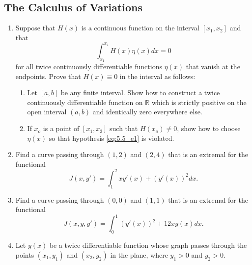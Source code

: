 \documentclass{article}
\begin{document}
\setcounter{subsection}{4}
\subsection{The Calculus of Variations}
\begin{enumerate}
      \item Suppose that $H(x)$ is a continuous function on the interval
            $[x_1, x_2]$ and that
            \begin{equation}
                  \int_{x_1}^{x_2}H(x)\eta (x)dx = 0
                  \label{eq:5.5_e1}
            \end{equation}
            for all twice continuously differentiable functions $\eta (x)$ that
            vanish at the endpoints. Prove that $H(x)\equiv 0$ in the interval
            as follows:
            \begin{enumerate}
                  \item Let $[a,b]$ be any finite interval. Show how to
                        construct a twice continuously differentiable function
                        on $\mathbb{R}$ which is strictly positive on the open
                        interval $(a,b)$ and identically zero everywhere else.
                  \item If $x_o$ is a point of $[x_1, x_2]$ such that $H(x_o)
                              \neq 0$, show how to choose $\eta (x)$ so that
                        hypothesis \eqref{eq:5.5_e1} is violated.
            \end{enumerate}
            \setcounter{enumi}{2}
      \item Find a curve passing through $(1,2)$ and $(2,4)$ that is an extremal
            for the functional
            \begin{equation}
                  J(x, y') = \int_1^2xy'(x)+(y'(x))^2dx.
            \end{equation}
            \setcounter{enumi}{4}
      \item Find a curve passing through $(0,0)$ and $(1,1)$ that is an extremal
            for the functional
            \begin{equation}
                  J(x, y, y') = \int_0^1(y'(x))^2+12xy(x)dx.
            \end{equation}
            \setcounter{enumi}{7}
      \item Let $y(x)$ be a twice differentiable function whose graph passes
            through the points $(x_1,y_1)$ and $(x_2,y_2)$ in the plane, where
            $y_1>0$ and $y_2>0$.

\end{enumerate}
\end{document}
